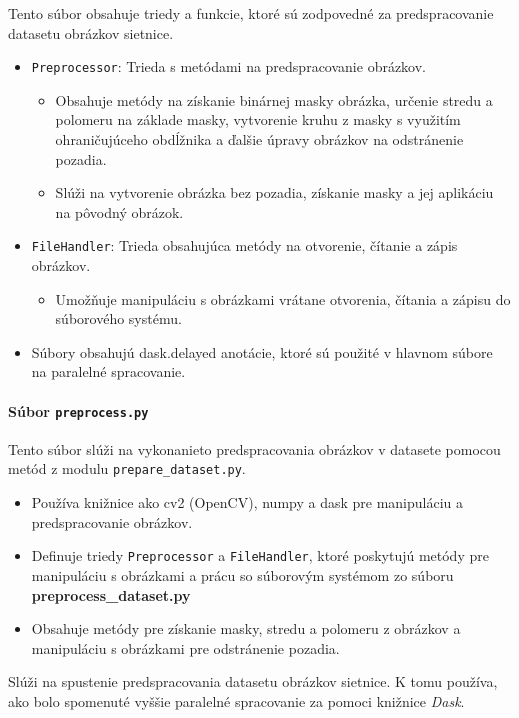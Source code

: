 \documentclass[a4paper, 11pt]{article}
\begin{document}
Tento súbor obsahuje triedy a funkcie, ktoré sú zodpovedné za predspracovanie datasetu obrázkov sietnice.

\begin{itemize}
    \item \texttt{Preprocessor}: Trieda s metódami na predspracovanie obrázkov.
    \begin{itemize}
        \item Obsahuje metódy na získanie binárnej masky obrázka, určenie stredu a polomeru na základe masky, vytvorenie kruhu z masky s využitím ohraničujúceho obdĺžnika a ďalšie úpravy obrázkov na odstránenie pozadia.
        \item Slúži na vytvorenie obrázka bez pozadia, získanie masky a jej aplikáciu na pôvodný obrázok.
    \end{itemize}
    
    \item \texttt{FileHandler}: Trieda obsahujúca metódy na otvorenie, čítanie a zápis obrázkov.
    \begin{itemize}
        \item Umožňuje manipuláciu s obrázkami vrátane otvorenia, čítania a zápisu do súborového systému.
    \end{itemize}
    
    \item Súbory obsahujú dask.delayed anotácie, ktoré sú použité v hlavnom súbore na paralelné spracovanie.
\end{itemize}

\paragraph{Súbor \texttt{preprocess.py}
}

Tento súbor slúži na vykonanieto predspracovania obrázkov v datasete pomocou metód z modulu \texttt{prepare\_dataset.py}.

\begin{itemize}
    \item Používa knižnice ako cv2 (OpenCV), numpy a dask pre manipuláciu a predspracovanie obrázkov.
    \item Definuje triedy \texttt{Preprocessor} a \texttt{FileHandler}, ktoré poskytujú metódy pre manipuláciu s obrázkami a prácu so súborovým systémom zo súboru \textbf{preprocess\_dataset.py}
    \item Obsahuje metódy pre získanie masky, stredu a polomeru z obrázkov a manipuláciu s obrázkami pre odstránenie pozadia.
\end{itemize}
     Slúži na spustenie predspracovania datasetu obrázkov sietnice. K tomu používa, ako bolo spomenuté vyššie paralelné spracovanie za pomoci knižnice \textit{Dask}.
\end{document}
